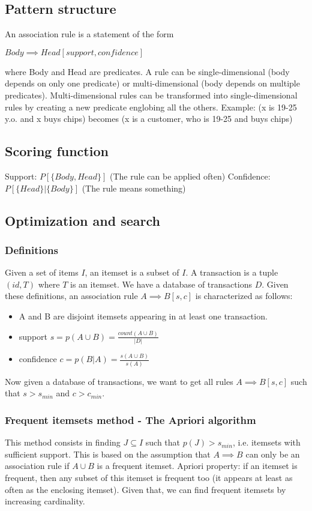 \subsection{Pattern structure}
An association rule is a statement of the form

$Body \implies Head [support, confidence]$

where Body and Head are predicates.
A rule can be single-dimensional (body depends on only one predicate) or multi-dimensional (body depends on multiple predicates). Multi-dimensional rules can be transformed into single-dimensional rules by creating a new predicate englobing all the others.
Example: (x is 19-25 y.o. and x buys chips) becomes (x is a customer, who is 19-25 and buys chips)

\subsection{Scoring function}
Support: $P[\{Body, Head\}]$ (The rule can be applied often)
Confidence: $P[\{Head\} | \{Body\}]$ (The rule means something)

\subsection{Optimization and search}

\subsubsection{Definitions}
Given a set of items $I$, an itemset is a subset of $I$.
A transaction is a tuple $(id, T)$ where $T$ is an itemset.
We have a database of transactions $D$.
Given these definitions, an association rule $A \implies B [s, c]$ is characterized as follows:
\begin{itemize}
\item A and B are disjoint itemsets appearing in at least one transaction.
\item support $s = p(A \cup B) = \frac{count(A \cup B)}{|D|}$
\item confidence $c = p(B|A) = \frac{s(A \cup B)}{s(A)}$
\end{itemize}

Now given a database of transactions, we want to get all rules $A \implies B [s,c]$ such that $s > s_{min}$ and $c > c_{min}$.

\subsubsection{Frequent itemsets method - The Apriori algorithm}
This method consists in finding $J \subseteq I$ such that $p(J) > s_{min}$, i.e. itemsets with sufficient support.
This is based on the assumption that $A \implies B$ can only be an association rule if $A \cup B$ is a frequent itemset.
Apriori property: if an itemset is frequent, then any subset of this itemset is frequent too (it appears at least as often as the enclosing itemset).
Given that, we can find frequent itemsets by increasing cardinality.

